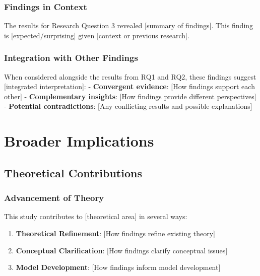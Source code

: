 \documentclass[
  12pt,
  letterpaper,
  12pt,
  letterpaper,
  oneside]{report}
\providecommand{\tightlist}{%
  \setlength{\itemsep}{0pt}\setlength{\parskip}{0pt}}
\begin{document}
\subsubsection{Findings in Context}\label{findings-in-context-2}

The results for Research Question 3 revealed {[}summary of findings{]}.
This finding is {[}expected/surprising{]} given {[}context or previous
research{]}.

\subsubsection{Integration with Other
Findings}\label{integration-with-other-findings}

When considered alongside the results from RQ1 and RQ2, these findings
suggest {[}integrated interpretation{]}: - \textbf{Convergent evidence}:
{[}How findings support each other{]} - \textbf{Complementary insights}:
{[}How findings provide different perspectives{]} - \textbf{Potential
contradictions}: {[}Any conflicting results and possible explanations{]}

\section{Broader Implications}\label{broader-implications}

\subsection{Theoretical Contributions}\label{theoretical-contributions}

\subsubsection{Advancement of Theory}\label{advancement-of-theory}

This study contributes to {[}theoretical area{]} in several ways:

\begin{enumerate}
\def\labelenumi{\arabic{enumi}.}
\tightlist
\item
  \textbf{Theoretical Refinement}: {[}How findings refine existing
  theory{]}
\item
  \textbf{Conceptual Clarification}: {[}How findings clarify conceptual
  issues{]}
\item
  \textbf{Model Development}: {[}How findings inform model
  development{]}
\end{enumerate}
\end{document}

